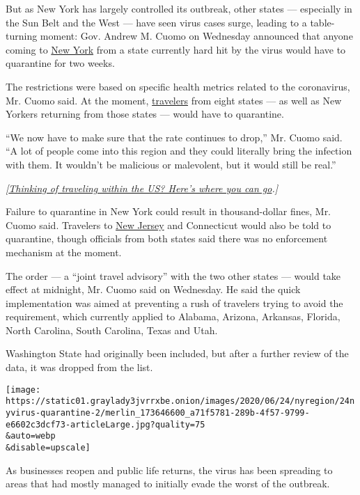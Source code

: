 But as New York has largely controlled its outbreak, other states ---
especially in the Sun Belt and the West --- have seen virus cases surge,
leading to a table-turning moment: Gov. Andrew M. Cuomo on Wednesday
announced that anyone coming to
\href{https://www.nytimes3xbfgragh.onion/2020/07/14/nyregion/ny-quarantine-rules.html}{New
York} from a state currently hard hit by the virus would have to
quarantine for two weeks.

The restrictions were based on specific health metrics related to the
coronavirus, Mr. Cuomo said. At the moment,
\href{https://www.nytimes3xbfgragh.onion/2020/07/16/travel/virus-vacation.html}{travelers}
from eight states --- as well as New Yorkers returning from those states
--- would have to quarantine.

``We now have to make sure that the rate continues to drop,'' Mr. Cuomo
said. ``A lot of people come into this region and they could literally
bring the infection with them. It wouldn't be malicious or malevolent,
but it would still be real.''

\emph{{[}}\href{https://www.nytimes3xbfgragh.onion/2020/07/10/travel/state-travel-restrictions.html}{\emph{Thinking
of traveling within the US? Here's where you can go}}\emph{.{]}}

Failure to quarantine in New York could result in thousand-dollar fines,
Mr. Cuomo said. Travelers to
\href{https://www.nytimes3xbfgragh.onion/2020/06/29/nyregion/Coronavirus-restaurants-reopening-ny-nj.html}{New
Jersey} and Connecticut would also be told to quarantine, though
officials from both states said there was no enforcement mechanism at
the moment.

The order --- a ``joint travel advisory'' with the two other states ---
would take effect at midnight, Mr. Cuomo said on Wednesday. He said the
quick implementation was aimed at preventing a rush of travelers trying
to avoid the requirement, which currently applied to Alabama, Arizona,
Arkansas, Florida, North Carolina, South Carolina, Texas and Utah.

Washington State had originally been included, but after a further
review of the data, it was dropped from the list.

\texttt{[image: https://static01.graylady3jvrrxbe.onion/images/2020/06/24/nyregion/24nyvirus-quarantine-2/merlin\_173646600\_a71f5781-289b-4f57-9799-e6602c3dcf73-articleLarge.jpg?quality=75\\\&auto=webp\\\&disable=upscale]}

As businesses reopen and public life returns, the virus has been
spreading to areas that had mostly managed to initially evade the worst
of the outbreak.

